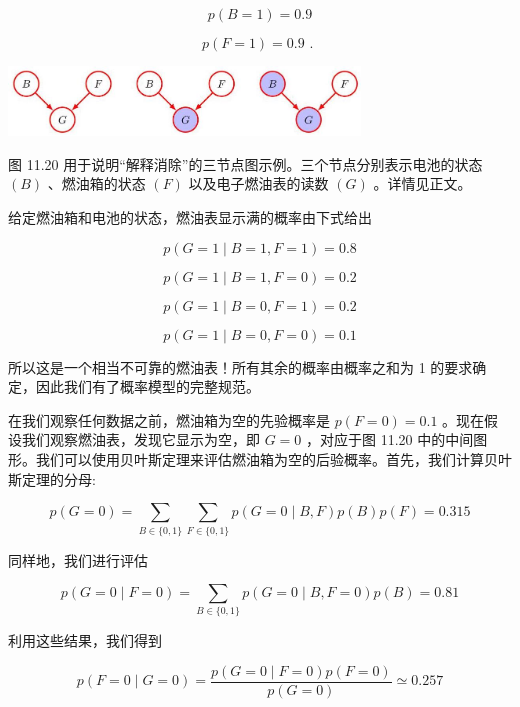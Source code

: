 \documentclass[10pt]{article}
\begin{document}
\[
p\left( {B = 1}\right)  = {0.9}
\]

\[
p\left( {F = 1}\right)  = {0.9}\text{ . }
\]

\begin{center}
\includegraphics[max width=0.7\textwidth]{images/0194e279-9b28-703a-88f4-c3ac21e2010d_360_583_1669_899_179_0.jpg}
\end{center}
\hspace*{3em} 

图 11.20 用于说明“解释消除”的三节点图示例。三个节点分别表示电池的状态 \(\left( B\right)\) 、燃油箱的状态 \(\left( F\right)\) 以及电子燃油表的读数 \(\left( G\right)\) 。详情见正文。

给定燃油箱和电池的状态，燃油表显示满的概率由下式给出

\[
p\left( {G = 1 \mid  B = 1,F = 1}\right)  = {0.8}
\]

\[
p\left( {G = 1 \mid  B = 1,F = 0}\right)  = {0.2}
\]

\[
p\left( {G = 1 \mid  B = 0,F = 1}\right)  = {0.2}
\]

\[
p\left( {G = 1 \mid  B = 0,F = 0}\right)  = {0.1}
\]

所以这是一个相当不可靠的燃油表！所有其余的概率由概率之和为 1 的要求确定，因此我们有了概率模型的完整规范。

在我们观察任何数据之前，燃油箱为空的先验概率是 \(p\left( {F = 0}\right)  = {0.1}\) 。现在假设我们观察燃油表，发现它显示为空，即 \(G = 0\) ，对应于图 11.20 中的中间图形。我们可以使用贝叶斯定理来评估燃油箱为空的后验概率。首先，我们计算贝叶斯定理的分母:

\[
p\left( {G = 0}\right)  = \mathop{\sum }\limits_{{B \in  \{ 0,1\} }}\mathop{\sum }\limits_{{F \in  \{ 0,1\} }}p\left( {G = 0 \mid  B,F}\right) p\left( B\right) p\left( F\right)  = {0.315} \tag{11.32}
\]

同样地，我们进行评估

\[
p\left( {G = 0 \mid  F = 0}\right)  = \mathop{\sum }\limits_{{B \in  \{ 0,1\} }}p\left( {G = 0 \mid  B,F = 0}\right) p\left( B\right)  = {0.81} \tag{11.33}
\]

利用这些结果，我们得到

\[
p\left( {F = 0 \mid  G = 0}\right)  = \frac{p\left( {G = 0 \mid  F = 0}\right) p\left( {F = 0}\right) }{p\left( {G = 0}\right) } \simeq  {0.257} \tag{11.34}
\]
\end{document}
